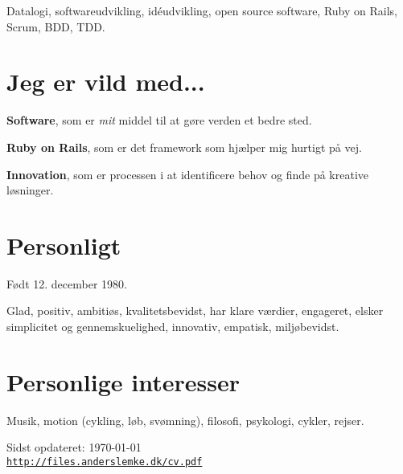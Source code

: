 \documentclass[a4paper]{article}
\renewenvironment{itemize}{
  \begin{list}{}
    { \setlength{\itemsep}{5pt}
      \setlength{\parsep}{0pt}
      \setlength{\topsep}{0pt}
      \setlength{\leftmargin}{0em} } }{
  \end{list}}
\begin{document}
Datalogi, softwareudvikling, idéudvikling, open source software, Ruby on Rails, Scrum, BDD, TDD.

\section*{Jeg er vild med...}

\begin{itemize}
  \item \textbf{Software}, som er \emph{mit} middel til at gøre verden et bedre sted.
  \item \textbf{Ruby on Rails}, som er det framework som hjælper mig hurtigt på vej.
  \item \textbf{Innovation}, som er processen i at identificere behov og finde på kreative løsninger.
\end{itemize}

\section*{Personligt}
Født 12. december 1980.

Glad, positiv, ambitiøs, kvalitetsbevidst, har klare værdier, engageret, elsker simplicitet og gennemskuelighed, innovativ, empatisk, miljøbevidst.


\section*{Personlige interesser} 

Musik, motion (cykling, løb, svømning), filosofi, psykologi, cykler, rejser.

\bigskip

\begin{center}
\begin{footnotesize}
Sidst opdateret: \today \\
\href{http://files.anderslemke.dk/cv.pdf}{\tt http://files.anderslemke.dk/cv.pdf}
\end{footnotesize}
\end{center}
\end{document}
